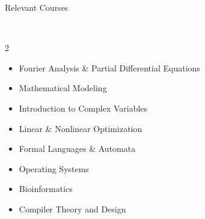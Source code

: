 \documentclass[9pt]{article}
\newenvironment{changemargin}[2]{%
  \begin{list}{}{%
    \setlength{\topsep}{0pt}%
    \setlength{\leftmargin}{#1}%
    \setlength{\rightmargin}{#2}%
    \setlength{\listparindent}{\parindent}%
    \setlength{\itemindent}{\parindent}%
    \setlength{\parsep}{\parskip}%
  }%
  \item[]}{\end{list}
}
\newcommand{\lineover}{
    \begin{changemargin}{-0.05in}{-0.05in}
        \vspace*{-8pt}
        \hrulefill \\
        \vspace*{-2pt}
    \end{changemargin}
}
\newcommand{\header}[1]{
    \begin{changemargin}{-0.5in}{-0.5in}
        {\large #1}\\
        \lineover
    \end{changemargin}
}
\newenvironment{body} {
    \vspace*{-16pt}
    \begin{changemargin}{-0.20in}{-0.5in}
  }
    {\end{changemargin}
}
\begin{document}
\header{Relevant Courses}
\begin{body}
    \vspace{4pt}
    \begin{multicols}{2}
        \begin{itemize} \itemsep -0pt
            \item [] Fourier Analysis \& Partial Differential Equations
            \item [] Mathematical Modeling
            \item [] Introduction to Complex Variables
            \item [] Linear \& Nonlinear Optimization

            \item [] Formal Languages \& Automata
            \item [] Operating Systems
            \item [] Bioinformatics
            \item [] Compiler Theory and Design


\end{itemize}
\end{multicols}
\end{body}
\end{document}
